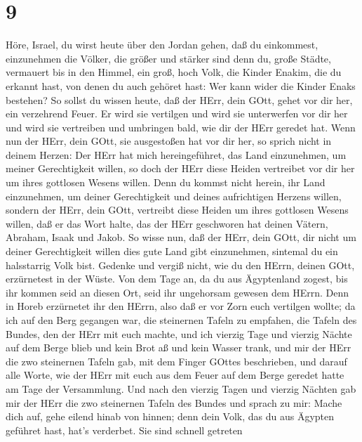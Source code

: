 \hypertarget{section-8}{%
\section{9}\label{section-8}}

 Höre, Israel, du wirst heute über den Jordan gehen, daß du
einkommest, einzunehmen die Völker, die größer und stärker sind denn du,
große Städte, vermauert bis in den Himmel,  ein groß, hoch
Volk, die Kinder Enakim, die du erkannt hast, von denen du auch gehöret
hast: Wer kann wider die Kinder Enaks bestehen?  So sollst
du wissen heute, daß der HErr, dein GOtt, gehet vor dir her, ein
verzehrend Feuer. Er wird sie vertilgen und wird sie unterwerfen vor dir
her und wird sie vertreiben und umbringen bald, wie dir der HErr geredet
hat.  Wenn nun der HErr, dein GOtt, sie ausgestoßen hat vor
dir her, so sprich nicht in deinem Herzen: Der HErr hat mich
hereingeführet, das Land einzunehmen, um meiner Gerechtigkeit willen, so
doch der HErr diese Heiden vertreibet vor dir her um ihres gottlosen
Wesens willen.  Denn du kommst nicht herein, ihr Land
einzunehmen, um deiner Gerechtigkeit und deines aufrichtigen Herzens
willen, sondern der HErr, dein GOtt, vertreibt diese Heiden um ihres
gottlosen Wesens willen, daß er das Wort halte, das der HErr geschworen
hat deinen Vätern, Abraham, Isaak und Jakob.  So wisse nun,
daß der HErr, dein GOtt, dir nicht um deiner Gerechtigkeit willen dies
gute Land gibt einzunehmen, sintemal du ein halsstarrig Volk bist.
 Gedenke und vergiß nicht, wie du den HErrn, deinen GOtt,
erzürnetest in der Wüste. Von dem Tage an, da du aus Ägyptenland zogest,
bis ihr kommen seid an diesen Ort, seid ihr ungehorsam gewesen dem
HErrn.  Denn in Horeb erzürnetet ihr den HErrn, also daß er
vor Zorn euch vertilgen wollte;  da ich auf den Berg
gegangen war, die steinernen Tafeln zu empfahen, die Tafeln des Bundes,
den der HErr mit euch machte, und ich vierzig Tage und vierzig Nächte
auf dem Berge blieb und kein Brot aß und kein Wasser trank,
 und mir der HErr die zwo steinernen Tafeln gab, mit dem
Finger GOttes beschrieben, und darauf alle Worte, wie der HErr mit euch
aus dem Feuer auf dem Berge geredet hatte am Tage der Versammlung.
 Und nach den vierzig Tagen und vierzig Nächten gab mir der
HErr die zwo steinernen Tafeln des Bundes  und sprach zu
mir: Mache dich auf, gehe eilend hinab von hinnen; denn dein Volk, das
du aus Ägypten geführet hast, hat's verderbet. Sie sind schnell getreten
